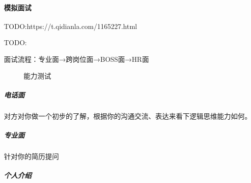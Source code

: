 \documentclass[letterpaper,10pt,english]{sphinxmanual}
\begin{document}
\paragraph{模拟面试}
\label{\detokenize{chapter_interview/simulate_interview:id1}}\label{\detokenize{chapter_interview/simulate_interview::doc}}
TODO:https://t.qidianla.com/1165227.html

TODO: 

面试流程：专业面→跨岗位面→BOSS面→HR面
%
\begin{footnote}[876]\sphinxAtStartFootnote
{}
%
\end{footnote}

\begin{figure}[H]
\centering
\capstart

\noindent{}
\caption{能力测试}\label{\detokenize{chapter_interview/simulate_interview:id13}}\end{figure}


\subparagraph{电话面}
\label{\detokenize{chapter_interview/simulate_interview:id2}}
对方对你做一个初步的了解，根据你的沟通交流、表达来看下逻辑思维能力如何。


\subparagraph{专业面}
\label{\detokenize{chapter_interview/simulate_interview:id3}}
针对你的简历提问


\subparagraph{个人介绍}
\label{\detokenize{chapter_interview/simulate_interview:id4}}
\end{document}
